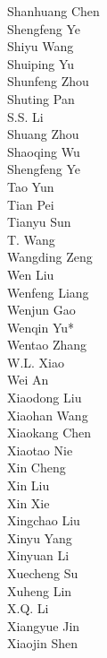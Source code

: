 \documentclass[11pt, a4paper, logo, copyright, nonumbering]{deepseek}
\begin{document}
\begin{multicols}{2}
\color{damaiblue} Shanhuang Chen \\
\color{damaiblue} Shengfeng Ye \\
\color{damaiblue} Shiyu Wang \\
\color{damaiblue} Shuiping Yu \\
\color{damaiblue} Shunfeng Zhou \\
\color{damaiblue} Shuting Pan \\
\color{damaiblue} S.S. Li \\
\color{damaiblue} Shuang Zhou \\
\color{damaiblue} Shaoqing Wu \\
\color{damaiblue} Shengfeng Ye \\
\color{damaiblue} Tao Yun \\
\color{damaiblue} Tian Pei \\
\color{damaiblue} Tianyu Sun \\
\color{damaiblue} T. Wang \\
\color{damaiblue} Wangding Zeng \\
\color{damaiblue} Wen Liu \\
\color{damaiblue} Wenfeng Liang \\
\color{damaiblue} Wenjun Gao \\
\color{damaiblue} Wenqin Yu* \\
\color{damaiblue} Wentao Zhang \\
\color{damaiblue} W.L. Xiao \\
\color{damaiblue} Wei An \\
\color{damaiblue} Xiaodong Liu \\
\color{damaiblue} Xiaohan Wang \\
\color{damaiblue} Xiaokang Chen \\
\color{damaiblue} Xiaotao Nie \\
\color{damaiblue} Xin Cheng \\
\color{damaiblue} Xin Liu \\
\color{damaiblue} Xin Xie \\
\color{damaiblue} Xingchao Liu \\
\color{damaiblue} Xinyu Yang \\
\color{damaiblue} Xinyuan Li \\
\color{damaiblue} Xuecheng Su \\
\color{damaiblue} Xuheng Lin \\
\color{damaiblue} X.Q. Li \\
\color{damaiblue} Xiangyue Jin \\
\color{damaiblue} Xiaojin Shen \\

\end{multicols}
\end{document}
